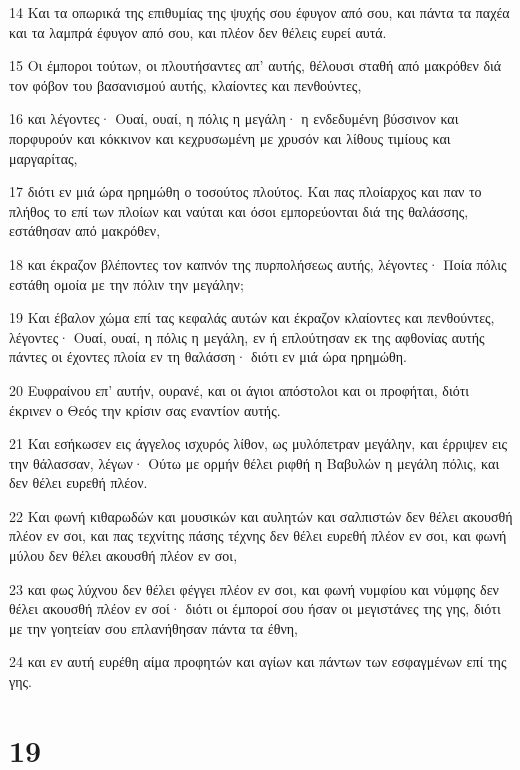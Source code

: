 \par 14 Και τα οπωρικά της επιθυμίας της ψυχής σου έφυγον από σου, και πάντα τα παχέα και τα λαμπρά έφυγον από σου, και πλέον δεν θέλεις ευρεί αυτά.
\par 15 Οι έμποροι τούτων, οι πλουτήσαντες απ' αυτής, θέλουσι σταθή από μακρόθεν διά τον φόβον του βασανισμού αυτής, κλαίοντες και πενθούντες,
\par 16 και λέγοντες· Ουαί, ουαί, η πόλις η μεγάλη· η ενδεδυμένη βύσσινον και πορφυρούν και κόκκινον και κεχρυσωμένη με χρυσόν και λίθους τιμίους και μαργαρίτας,
\par 17 διότι εν μιά ώρα ηρημώθη ο τοσούτος πλούτος. Και πας πλοίαρχος και παν το πλήθος το επί των πλοίων και ναύται και όσοι εμπορεύονται διά της θαλάσσης, εστάθησαν από μακρόθεν,
\par 18 και έκραζον βλέποντες τον καπνόν της πυρπολήσεως αυτής, λέγοντες· Ποία πόλις εστάθη ομοία με την πόλιν την μεγάλην;
\par 19 Και έβαλον χώμα επί τας κεφαλάς αυτών και έκραζον κλαίοντες και πενθούντες, λέγοντες· Ουαί, ουαί, η πόλις η μεγάλη, εν ή επλούτησαν εκ της αφθονίας αυτής πάντες οι έχοντες πλοία εν τη θαλάσση· διότι εν μιά ώρα ηρημώθη.
\par 20 Ευφραίνου επ' αυτήν, ουρανέ, και οι άγιοι απόστολοι και οι προφήται, διότι έκρινεν ο Θεός την κρίσιν σας εναντίον αυτής.
\par 21 Και εσήκωσεν εις άγγελος ισχυρός λίθον, ως μυλόπετραν μεγάλην, και έρριψεν εις την θάλασσαν, λέγων· Ούτω με ορμήν θέλει ριφθή η Βαβυλών η μεγάλη πόλις, και δεν θέλει ευρεθή πλέον.
\par 22 Και φωνή κιθαρωδών και μουσικών και αυλητών και σαλπιστών δεν θέλει ακουσθή πλέον εν σοι, και πας τεχνίτης πάσης τέχνης δεν θέλει ευρεθή πλέον εν σοι, και φωνή μύλου δεν θέλει ακουσθή πλέον εν σοι,
\par 23 και φως λύχνου δεν θέλει φέγγει πλέον εν σοι, και φωνή νυμφίου και νύμφης δεν θέλει ακουσθή πλέον εν σοί· διότι οι έμποροί σου ήσαν οι μεγιστάνες της γης, διότι με την γοητείαν σου επλανήθησαν πάντα τα έθνη,
\par 24 και εν αυτή ευρέθη αίμα προφητών και αγίων και πάντων των εσφαγμένων επί της γης.

\chapter{19}

